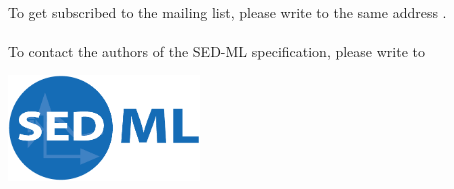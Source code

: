 \begin{titlepage}
\begin{center}
\begin{minipage}{5in}
\begin{center}
  \paragraph*{}
  To get subscribed to the mailing list, please write to the same address . 
  \paragraph*{}
  To contact the authors of the SED-ML specification, please write to 
\end{center}
\end{minipage}
\vfill


\centerline{\includegraphics[width=2in]{images/logoSedml.png}}


\end{center}

\end{titlepage}

%
%

\setcounter{page}{2}



